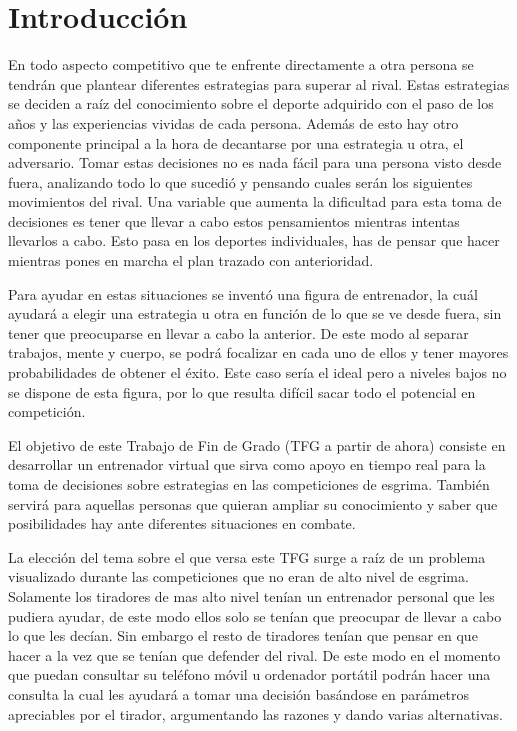 \documentclass[11pt,a4paper,twoside,final]{article}
\begin{document}
\tableofcontents  %

\renewcommand{\tablename}{Tabla} %

\newpage

\section{Introducción}

En todo aspecto competitivo que te enfrente directamente a otra persona se tendrán que plantear diferentes estrategias para superar al rival. Estas estrategias se deciden a raíz del conocimiento sobre el deporte adquirido con el paso de los años y las experiencias vividas de cada persona. Además de esto hay otro componente principal a la hora de decantarse por una estrategia u otra, el adversario. Tomar estas decisiones no es nada fácil para una persona visto desde fuera, analizando todo lo que sucedió y pensando cuales serán los siguientes movimientos del rival. Una variable que aumenta la dificultad para esta toma de decisiones es tener que llevar a cabo estos pensamientos mientras intentas llevarlos a cabo. Esto pasa en los deportes individuales, has de pensar que hacer mientras pones en marcha el plan trazado con anterioridad.

\smallskip
Para ayudar en estas situaciones se inventó una figura de entrenador, la cuál ayudará a elegir una estrategia u otra en función de lo que se ve desde fuera, sin tener que preocuparse en llevar a cabo la anterior. De este modo al separar trabajos, mente y cuerpo, se podrá focalizar en cada uno de ellos y tener mayores probabilidades de obtener el éxito. Este caso sería el ideal pero a niveles bajos no se dispone de esta figura, por lo que resulta difícil sacar todo el potencial en competición.

\bigskip
El objetivo de este Trabajo de Fin de Grado (TFG a partir de ahora) consiste en desarrollar un entrenador virtual que sirva como apoyo en tiempo real para la toma de decisiones sobre estrategias en las competiciones de esgrima. También servirá para aquellas personas que quieran ampliar su conocimiento y saber que posibilidades hay ante diferentes situaciones en combate.

\bigskip
La elección del tema sobre el que versa este TFG surge a raíz de un problema visualizado durante las competiciones que no eran de alto nivel de esgrima. Solamente los tiradores de mas alto nivel tenían un entrenador personal que les pudiera ayudar, de este modo ellos solo se tenían que preocupar de llevar a cabo lo que les decían. Sin embargo el resto de tiradores tenían que pensar en que hacer a la vez que se tenían que defender del rival. De este modo en el momento que puedan consultar su teléfono móvil u ordenador portátil podrán hacer una consulta la cual les ayudará a tomar una decisión basándose en parámetros apreciables por el tirador, argumentando las razones y dando varias alternativas.
\end{document}
